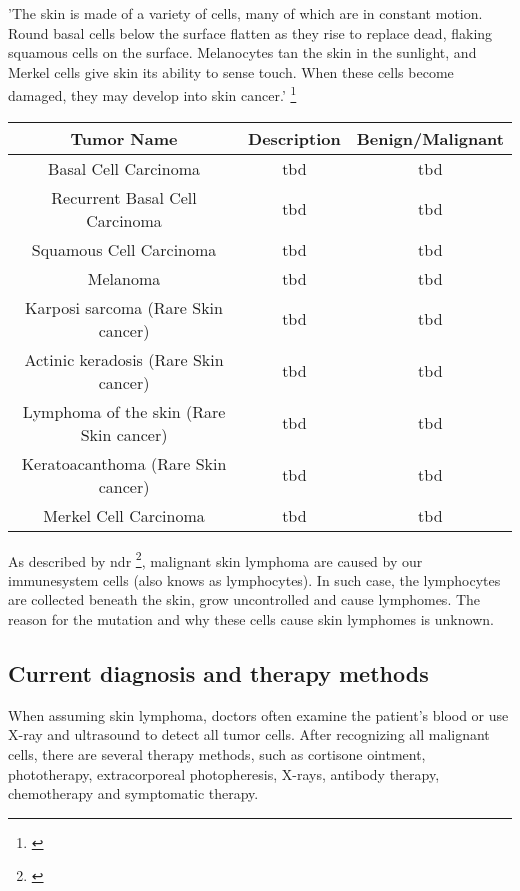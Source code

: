 'The skin is made of a variety of cells, many of which are in constant motion. Round basal cells below the surface flatten as they rise to replace dead, flaking squamous cells on the surface. Melanocytes tan the skin in the sunlight, and Merkel cells give skin its ability to sense touch. When these cells become damaged, they may develop into skin cancer.' \footnote{\cite{skin_cancer_types}} 

\begin{center}
 \begin{tabular}{|| c | c | c ||} 
 \hline
Tumor Name & Description & Benign/Malignant \\ [0.5ex] 
\hline\hline
Basal Cell Carcinoma & tbd & tbd \\
\hline
Recurrent Basal Cell Carcinoma & tbd & tbd \\
 \hline
 Squamous Cell Carcinoma & tbd & tbd \\
 \hline
Melanoma & tbd & tbd \\
 \hline
 Karposi sarcoma (Rare Skin cancer) & tbd & tbd \\
 \hline
  Actinic keradosis (Rare Skin cancer) & tbd & tbd \\
\hline
Lymphoma of the skin (Rare Skin cancer) & tbd & tbd \\
\hline
 Keratoacanthoma (Rare Skin cancer) & tbd & tbd \\
\hline
 Merkel Cell Carcinoma & tbd & tbd \\
 \hline
\end{tabular}
\end{center}



As described by \ac{ndr} \footnote{\cite{ndr_lymphom}}, malignant skin lymphoma are caused by our immunesystem cells (also knows as lymphocytes). In such case, the lymphocytes are collected beneath the skin, grow uncontrolled and cause lymphomes. The reason for the mutation and why these cells cause skin lymphomes is unknown.

\subsection{Current diagnosis and therapy methods}

When assuming skin lymphoma, doctors often examine the patient's blood or use X-ray and ultrasound to detect all tumor cells. 
After recognizing all malignant cells, there are several therapy methods, such as cortisone ointment, phototherapy, extracorporeal photopheresis, X-rays, antibody therapy, chemotherapy and symptomatic therapy.

